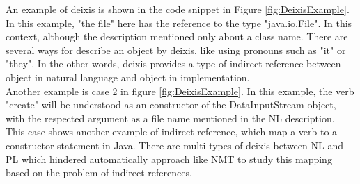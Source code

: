 An example of deixis is shown in the code snippet in Figure \ref{fig:DeixisExample}. In this example, "the file" here has the reference to the type "java.io.File". In this context, although the description mentioned only about a class name. There are several ways for describe an object by deixis, like using pronouns such as "it" or "they". In the other words, deixis provides a type of indirect reference between object in natural language and object in implementation. \\

Another example is case 2 in figure \ref{fig:DeixisExample}. In this example, the verb "create" will be understood as an constructor of the DataInputStream object, with the respected argument as a file name mentioned in the NL description. This case shows another example of indirect reference, which map a verb to a constructor statement in Java. There are multi types of deixis between NL and PL which hindered automatically approach like NMT to study this mapping based on the problem of indirect references. 

